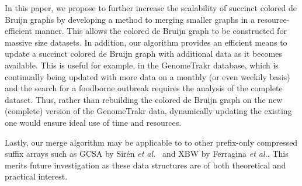 

In this paper, we propose to further increase the scalability of succinct colored de Bruijn graphs by developing a method to merging smaller graphs in a resource-efficient manner.  This allows the colored de Bruijn graph to be constructed for massive size datasets.  In addition, our algorithm provides an efficient means to update a succinct colored de Bruijn graph with additional data  as it becomes available. This is useful for example, in the GenomeTrakr database, which is continually being updated with more data on a monthly (or even weekily basis) and the search for a foodborne outbreak requires the analysis of the complete dataset.  Thus, rather than rebuilding the colored de Bruijn graph on the new (complete) version of the GenomeTrakr data, dynamically updating the existing one  would ensure ideal use of time and resources.  

Lastly, our merge algorithm may be applicable to  to other prefix-only compressed suffix arrays such as GCSA by Sir{\'e}n {\it et al.}~\cite{siren2014indexing} and XBW by Ferragina {\it et al.}\cite{ferragina2009compressing}.  This merits future investigation as these data structures are of both theoretical and practical interest. 
